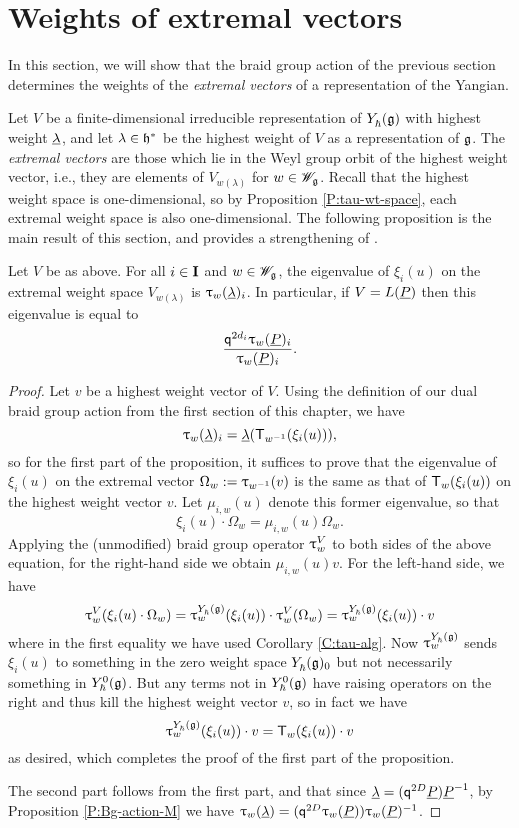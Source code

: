 \section{Weights of extremal vectors}

In this section, we will show that the braid group action of the previous section determines the weights of the \emph{extremal vectors} of a representation of the Yangian.

Let $V$ be a finite-dimensional irreducible representation of $\Yhg$ with highest weight $\ul$, and let $\lambda\in\h^*$ be the highest weight of $V$ as a representation of $\g$.
The \emph{extremal vectors} are those which lie in the Weyl group orbit of the highest weight vector, i.e., they are elements of $V_{w(\lambda)}$ for $w\in\Wg$.
Recall that the highest weight space is one-dimensional, so by Proposition \ref{P:tau-wt-space}, each extremal weight space is also one-dimensional.
The following proposition is the main result of this section, and provides a strengthening of \cite[Prop. 4.5]{tan_braid_2015}.

\begin{proposition}\label{P:extremal-weight}
    Let $V$ be as above.
    For all $i\in\I$ and $w\in\Wg$, the eigenvalue of $\xi_i(u)$ on the extremal weight space $V_{w(\lambda)}$ is $\braid_w(\ul)_i$.
    In particular, if $V=L(\uP)$ then this eigenvalue is equal to
    \[\frac{\q^{2d_i}\braid_w(\uP)_i}{\braid_w(\uP)_i}.\]
\end{proposition}
\begin{proof}
    Let $v$ be a highest weight vector of $V$.
    Using the definition of our dual braid group action from the first section of this chapter, we have
    \[\braid_w(\ul)_i = \ul(\mbraid_{w^{-1}}(\xi_i(u))),\]
    so for the first part of the proposition, it suffices to prove that the eigenvalue of $\xi_i(u)$ on the extremal vector $\Omega_w := \braid_{w^{-1}}(v)$ is the same as that of $\mbraid_w(\xi_i(u))$ on the highest weight vector $v$.
    Let $\mu_{i,w}(u)$ denote this former eigenvalue, so that
    \[\xi_i(u)\cdot\Omega_w = \mu_{i,w}(u)\Omega_w.\]
    Applying the (unmodified) braid group operator $\braid^V_w$ to both sides of the above equation, for the right-hand side we obtain $\mu_{i,w}(u)v$.
    For the left-hand side, we have
    \[\braid^V_w(\xi_i(u)\cdot\Omega_w) = \braid^{\Yhg}_w(\xi_i(u))\cdot\braid^V_w(\Omega_w) = \braid^{\Yhg}_w(\xi_i(u))\cdot v\]
    where in the first equality we have used Corollary \ref{C:tau-alg}.
    Now $\braid^{\Yhg}_w$ sends $\xi_i(u)$ to something in the zero weight space $\Yhg_0$ but not necessarily something in $\Yhg[0]$.
    But any terms not in $\Yhg[0]$ have raising operators on the right and thus kill the highest weight vector $v$, so in fact we have
    \[\braid^{\Yhg}_w(\xi_i(u))\cdot v = \mbraid_w(\xi_i(u))\cdot v\]
    as desired, which completes the proof of the first part of the proposition.

    The second part follows from the first part, and that since $\ul = (\q^{2D}\uP)\uP^{-1}$, by Proposition \ref{P:Bg-action-M} we have $\braid_w(\ul) = (\q^{2D}\braid_w(\uP))\braid_w(\uP)^{-1}$.
\end{proof}

